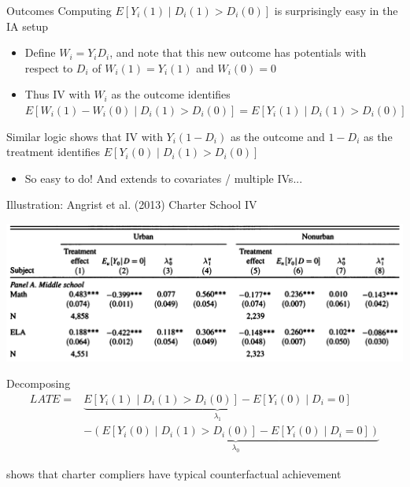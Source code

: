 \documentclass{beamer}
\begin{document}
\begin{frame}{Outcomes}
Computing $E[Y_i(1)\mid D_i(1)>D_i(0)]$ is surprisingly easy in the IA setup\smallskip
\begin{itemize}
\item Define $W_i=Y_iD_i$, and note that this new outcome has potentials with respect to $D_i$ of $W_i(1)=Y_i(1)$ and $W_i(0)=0$\smallskip\pause{}
\item Thus IV with $W_i$ as the outcome identifies $E[W_i(1)-W_i(0)\mid D_i(1)>D_i(0)]=E[Y_i(1)\mid D_i(1)>D_i(0)]$
\end{itemize}\medskip\pause{}
Similar logic shows that IV with $Y_i(1-D_i)$ as the outcome and $1-D_i$ as the treatment identifies $E[Y_i(0)\mid D_i(1)>D_i(0)]$\smallskip
\begin{itemize}
\item So easy to do! And extends to covariates / multiple IVs...
\end{itemize}
\end{frame}

\begin{frame}{Illustration: Angrist et al. (2013) Charter School IV}

\begin{center}
	\includegraphics[width=1\textwidth]{./lecture_includes/apw_2013.png}
\end{center}
Decomposing
\vspace{-0.5cm}
\begin{align*}
LATE=&\underbrace{E[Y_i(1)\mid D_i(1)>D_i(0)]-E[Y_i(0)\mid D_i=0]}_{\lambda_1} \\
&- \underbrace{(E[Y_i(0)\mid D_i(1)>D_i(0)]-E[Y_i(0)\mid D_i=0])}_{\lambda_0}
\end{align*}
\vspace{-0.7cm}

shows that charter compliers have typical counterfactual achievement

\end{frame}
\end{document}
